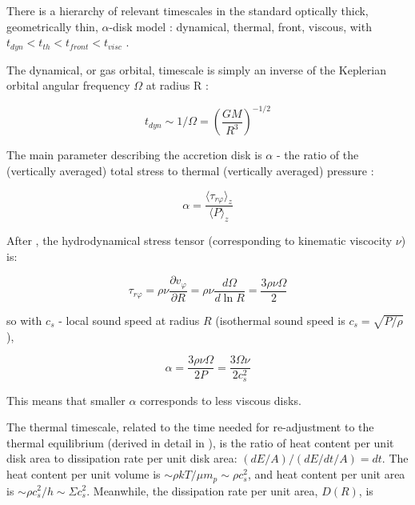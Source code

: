 \documentclass[twocolumn]{aastex62}
\begin{document}
There is a hierarchy of relevant timescales in the standard optically thick, geometrically thin, $\alpha$-disk model : dynamical, thermal, front, viscous, with   $t_{dyn} < t_{th} < t_{front}  < t_{visc} $ \citep{netzer2013, frank2002}.

The dynamical, or gas orbital, timescale is simply  an inverse of the Keplerian orbital angular frequency $ \Omega$  at radius R  : 

\begin{equation}
t_{dyn} \sim  1 / \Omega = \left( \frac{GM}{R^{3}}\right)^{-1/2}
\end{equation}


The main parameter  describing the accretion disk is $\alpha$ - the ratio of the (vertically averaged) total stress to thermal (vertically averaged) pressure \citep{lasota2016} : 

\begin{equation}
\alpha= \frac{\langle \tau_{r\varphi}  \rangle_{z} }{\langle P \rangle _{z}} 
\end{equation}


After \cite{lasota2016},  the hydrodynamical stress tensor (corresponding to  kinematic viscocity $\nu$) is:

\begin{equation}
\tau_{r\varphi } = \rho \nu \frac{\partial v_{\varphi}}{\partial R} = \rho \nu \frac{d \Omega}{d \ln{R}} = \frac{3 \rho \nu \Omega}{2}  
\end{equation}

so  with  $c_{s}$ -  local sound speed at radius $R$ (isothermal sound speed is $c_{s} = \sqrt{P/\rho}$),

\begin{equation}
\alpha  =   \frac{3 \rho \nu \Omega}{2 P} =  \frac{3 \Omega \nu}{2 c_{s}^{2}}
\end{equation}



This means that smaller $\alpha$ corresponds to less viscous disks. 


The thermal timescale, related to the time needed for re-adjustment to the thermal equilibrium (derived in detail in \cite{frank2002}), is the ratio of heat content per unit disk area to dissipation rate per unit disk area: $(dE / A) / (dE/dt /  A) = dt $.  The heat content per unit volume is $\sim \rho k T / \mu m_{p} \sim \rho c_{s}^{2}$, and heat content per unit area is  $\sim \rho c_{s}^{2} / h \sim \Sigma c_{s}^{2}$. Meanwhile, the dissipation rate per unit area, $D(R)$, is 
\end{document}
